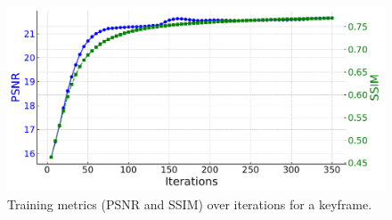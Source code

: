 \documentclass[lettersize,journal]{IEEEtran}
\begin{document}
\begin{figure}[h]
    \centering
    \includegraphics[width=0.9\columnwidth]{image/runtime/runtimechart.pdf}
    \caption{Training metrics (PSNR and SSIM) over iterations for a keyframe.}
    \label{fig:psnrssim}
    \vspace{-2.0em}%
\end{figure}
\end{document}
